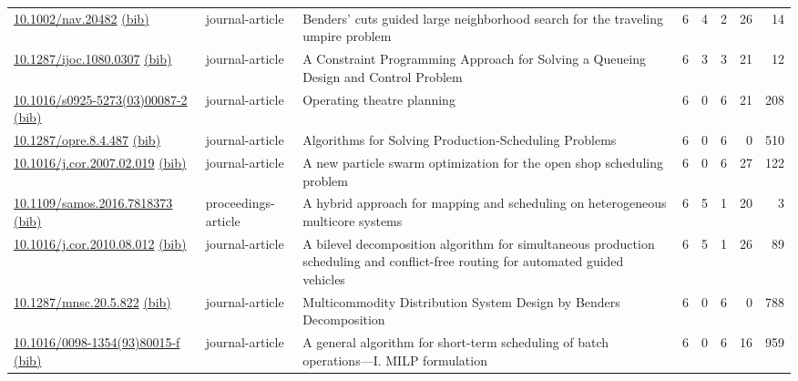 {\begin{longtable}{p{5cm}lp{11cm}rrrrr}
\href{http://dx.doi.org/10.1002/nav.20482}{10.1002/nav.20482} \href{https://www.doi2bib.org/bib/10.1002/nav.20482}{(bib)} & journal-article & Benders' cuts guided large neighborhood search for the traveling umpire problem & 6 & 4 & 2 & 26 & 14 \\
\href{http://dx.doi.org/10.1287/ijoc.1080.0307}{10.1287/ijoc.1080.0307} \href{https://www.doi2bib.org/bib/10.1287/ijoc.1080.0307}{(bib)} & journal-article & A Constraint Programming Approach for Solving a Queueing Design and Control Problem & 6 & 3 & 3 & 21 & 12 \\
\href{http://dx.doi.org/10.1016/s0925-5273(03)00087-2}{10.1016/s0925-5273(03)00087-2} \href{https://www.doi2bib.org/bib/10.1016/s0925-5273(03)00087-2}{(bib)} & journal-article & Operating theatre planning & 6 & 0 & 6 & 21 & 208 \\
\href{http://dx.doi.org/10.1287/opre.8.4.487}{10.1287/opre.8.4.487} \href{https://www.doi2bib.org/bib/10.1287/opre.8.4.487}{(bib)} & journal-article & Algorithms for Solving Production-Scheduling Problems & 6 & 0 & 6 & 0 & 510 \\
\href{http://dx.doi.org/10.1016/j.cor.2007.02.019}{10.1016/j.cor.2007.02.019} \href{https://www.doi2bib.org/bib/10.1016/j.cor.2007.02.019}{(bib)} & journal-article & A new particle swarm optimization for the open shop scheduling problem & 6 & 0 & 6 & 27 & 122 \\
\href{http://dx.doi.org/10.1109/samos.2016.7818373}{10.1109/samos.2016.7818373} \href{https://www.doi2bib.org/bib/10.1109/samos.2016.7818373}{(bib)} & proceedings-article & A hybrid approach for mapping and scheduling on heterogeneous multicore systems & 6 & 5 & 1 & 20 & 3 \\
\href{http://dx.doi.org/10.1016/j.cor.2010.08.012}{10.1016/j.cor.2010.08.012} \href{https://www.doi2bib.org/bib/10.1016/j.cor.2010.08.012}{(bib)} & journal-article & A bilevel decomposition algorithm for simultaneous production scheduling and conflict-free routing for automated guided vehicles & 6 & 5 & 1 & 26 & 89 \\
\href{http://dx.doi.org/10.1287/mnsc.20.5.822}{10.1287/mnsc.20.5.822} \href{https://www.doi2bib.org/bib/10.1287/mnsc.20.5.822}{(bib)} & journal-article & Multicommodity Distribution System Design by Benders Decomposition & 6 & 0 & 6 & 0 & 788 \\
\href{http://dx.doi.org/10.1016/0098-1354(93)80015-f}{10.1016/0098-1354(93)80015-f} \href{https://www.doi2bib.org/bib/10.1016/0098-1354(93)80015-f}{(bib)} & journal-article & A general algorithm for short-term scheduling of batch operations—I. MILP formulation & 6 & 0 & 6 & 16 & 959 \\

\end{longtable}}
